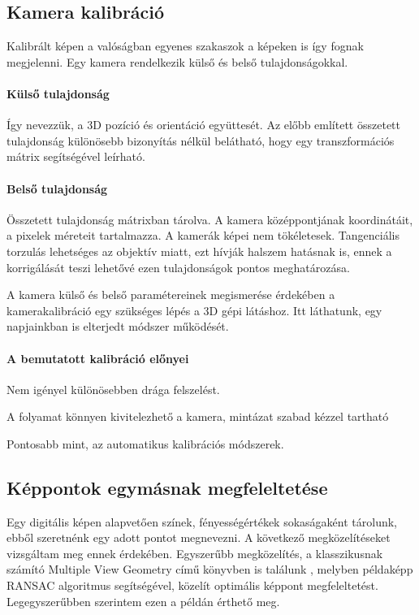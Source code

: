 \documentclass[12pt,a4paper,oneside]{report} %
\begin{document}
\subsection{Kamera kalibráció}
Kalibrált képen a valóságban egyenes szakaszok a képeken is így fognak megjelenni. Egy kamera rendelkezik külső és belső tulajdonságokkal. 
\paragraph{Külső tulajdonság} Így nevezzük, a 3D pozíció és  orientáció együttesét. Az előbb említett összetett  tulajdonság különösebb bizonyítás nélkül belátható, hogy egy transzformációs mátrix segítségével leírható.
\paragraph{Belső tulajdonság} 
Összetett tulajdonság mátrixban tárolva. A kamera középpontjának koordinátáit, a pixelek méreteit tartalmazza.  A kamerák képei nem tökéletesek. Tangenciális torzulás lehetséges az objektív miatt, ezt hívják halszem hatásnak is, ennek a korrigálását teszi lehetővé ezen tulajdonságok pontos meghatározása. 
\par  A kamera külső és belső paramétereinek megismerése érdekében a kamerakalibráció egy szükséges lépés a 3D gépi látáshoz. Itt \cite{zhang1999flexible} láthatunk, egy  napjainkban is elterjedt módszer működését.
\paragraph{A bemutatott kalibráció előnyei} 
\begin{compactitem}
	\item Nem igényel különösebben drága felszelést. 
	\item A folyamat könnyen kivitelezhető a kamera, mintázat szabad kézzel tartható 
	\item Pontosabb mint, az automatikus kalibrációs módszerek.
\end{compactitem}

\subsection{Képpontok egymásnak megfeleltetése}
Egy digitális képen alapvetően színek, fényességértékek sokaságaként tárolunk, ebből szeretnénk egy adott pontot megnevezni. A következő megközelítéseket vizsgáltam meg ennek érdekében. Egyszerűbb megközelítés, a klasszikusnak számító Multiple View Geometry című könyvben is találunk \cite[ó.~140]{hartley2003multiple}, melyben példaképp RANSAC \cite{derpanis2010overview} algoritmus segítségével, közelít optimális képpont megfeleltetést. Legegyszerűbben szerintem ezen a példán érthető meg.
\end{document}
